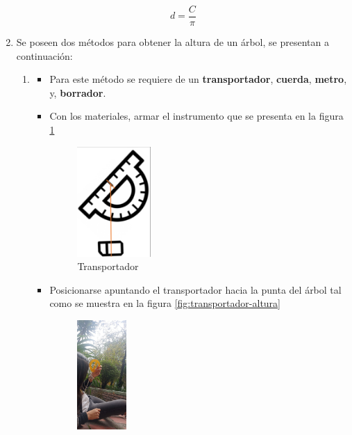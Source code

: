 \documentclass{article}
\begin{document}
\begin{enumerate}
        \[
        d = \frac{C}{\pi}
        \]
  \item Se poseen dos métodos para obtener la altura de un árbol, se presentan a continuación:
        \begin{enumerate}
          \item \begin{itemize}
                  \item Para este método se requiere de un \textbf{transportador}, \textbf{cuerda}, \textbf{metro}, y, \textbf{borrador}.
                  \item Con los materiales, armar el instrumento que se presenta en la figura \ref{fig:transportador}
                        \begin{figure}[H]
                          \centering
                          \includegraphics[width=0.3\textwidth]{img/Instrumento.png}
                          \caption{Transportador}
                          \label{fig:transportador}
                        \end{figure}
                  \item Posicionarse apuntando el transportador hacia la punta del árbol tal como se muestra en la figura \ref{fig:transportador-altura}
                        \begin{figure}[H]
                          \centering
                          \includegraphics[width=0.2\textwidth]{img/Altura2.jpg}

\end{figure}
\end{itemize}
\end{enumerate}
\end{enumerate}
\end{document}
